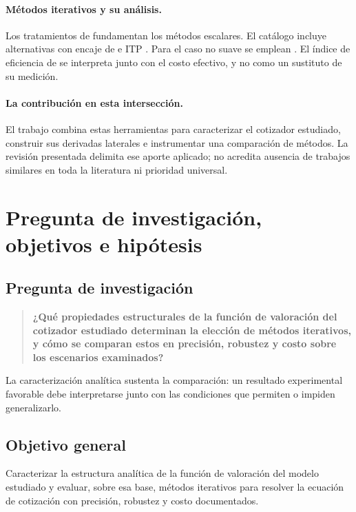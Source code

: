 \paragraph{Métodos iterativos y su análisis.}
Los tratamientos de \citet{burden2016,atkinson1989,stoer2002,quarteroni2007}
fundamentan los métodos escalares. El catálogo incluye alternativas con encaje de
\citet{brent1973,ridders1979,dowell1972} e ITP \citep{oliveira2021}. Para el
caso no suave se emplean \citet{qi1993,facchinei2003}. El índice de eficiencia de
\citet{ostrowski1966} se interpreta junto con el costo efectivo, y no como un
sustituto de su medición.

\paragraph{La contribución en esta intersección.}
El trabajo combina estas herramientas para caracterizar el cotizador estudiado,
construir sus derivadas laterales e instrumentar una comparación de métodos.
La revisión presentada delimita ese aporte aplicado; no acredita ausencia de
trabajos similares en toda la literatura ni prioridad universal.

\section{Pregunta de investigación, objetivos e hipótesis}

\subsection*{Pregunta de investigación}
\begin{quote}
\textbf{¿Qué propiedades estructurales de la función de valoración del cotizador
estudiado determinan la elección de métodos iterativos, y cómo se comparan estos
en precisión, robustez y costo sobre los escenarios examinados?}
\end{quote}

La caracterización analítica sustenta la comparación: un resultado experimental
favorable debe interpretarse junto con las condiciones que permiten o impiden
generalizarlo.

\subsection*{Objetivo general}
Caracterizar la estructura analítica de la función de valoración del modelo
estudiado y evaluar, sobre esa base, métodos iterativos para resolver la ecuación
de cotización con precisión, robustez y costo documentados.

